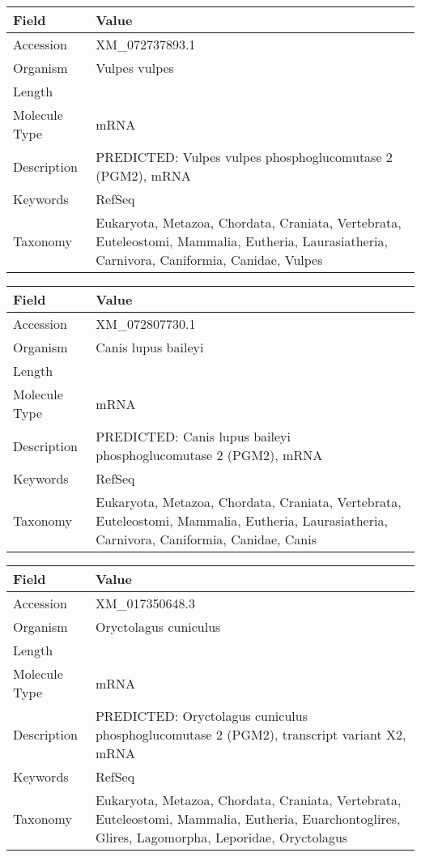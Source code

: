 \documentclass[10pt]{article}
\begin{document}
\vspace{1em}
{\footnotesize
\begin{longtable}{>{\raggedright\arraybackslash}p{4.5cm} >{\raggedright\arraybackslash}p{11.5cm}}
\textbf{Field} & \textbf{Value} \\
\hline
Accession & XM\_072737893.1 \\
Organism & Vulpes vulpes \\
Length & 2779 \\
Molecule Type & mRNA \\
Description & PREDICTED: Vulpes vulpes phosphoglucomutase 2 (PGM2), mRNA \\
Keywords & RefSeq \\
Taxonomy & Eukaryota, Metazoa, Chordata, Craniata, Vertebrata, Euteleostomi, Mammalia, Eutheria, Laurasiatheria, Carnivora, Caniformia, Canidae, Vulpes \\
\end{longtable}
}

\vspace{1em}
{\footnotesize
\begin{longtable}{>{\raggedright\arraybackslash}p{4.5cm} >{\raggedright\arraybackslash}p{11.5cm}}
\textbf{Field} & \textbf{Value} \\
\hline
Accession & XM\_072807730.1 \\
Organism & Canis lupus baileyi \\
Length & 2764 \\
Molecule Type & mRNA \\
Description & PREDICTED: Canis lupus baileyi phosphoglucomutase 2 (PGM2), mRNA \\
Keywords & RefSeq \\
Taxonomy & Eukaryota, Metazoa, Chordata, Craniata, Vertebrata, Euteleostomi, Mammalia, Eutheria, Laurasiatheria, Carnivora, Caniformia, Canidae, Canis \\
\end{longtable}
}

\vspace{1em}
{\footnotesize
\begin{longtable}{>{\raggedright\arraybackslash}p{4.5cm} >{\raggedright\arraybackslash}p{11.5cm}}
\textbf{Field} & \textbf{Value} \\
\hline
Accession & XM\_017350648.3 \\
Organism & Oryctolagus cuniculus \\
Length & 6319 \\
Molecule Type & mRNA \\
Description & PREDICTED: Oryctolagus cuniculus phosphoglucomutase 2 (PGM2), transcript variant X2, mRNA \\
Keywords & RefSeq \\
Taxonomy & Eukaryota, Metazoa, Chordata, Craniata, Vertebrata, Euteleostomi, Mammalia, Eutheria, Euarchontoglires, Glires, Lagomorpha, Leporidae, Oryctolagus \\
\end{longtable}
}
\end{document}
